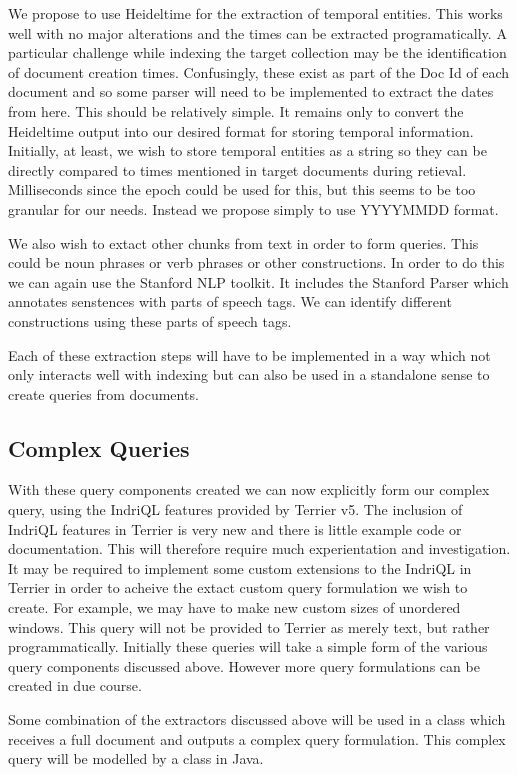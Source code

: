 \documentclass{mprop}
\begin{document}
We propose to use Heideltime for the extraction of temporal entities.
This works well with no major alterations and the times can be extracted programatically.
A particular challenge while indexing the target collection may be the identification of document creation times.
Confusingly, these exist as part of the Doc Id of each document and so some parser will need to be implemented to extract the dates from here.
This should be relatively simple.
It remains only to convert the Heideltime output into our desired format for storing temporal information.
Initially, at least, we wish to store temporal entities as a string so they can be directly compared to times mentioned in target documents during retieval.
Milliseconds since the epoch could be used for this, but this seems to be too granular for our needs.
Instead we propose simply to use YYYYMMDD format.

We also wish to extact other chunks from text in order to form queries.
This could be noun phrases or verb phrases or other constructions.
In order to do this we can again use the Stanford NLP toolkit.
It includes the Stanford Parser which annotates senstences with parts of speech tags.
We can identify different constructions using these parts of speech tags.

Each of these extraction steps will have to be implemented in a way which not only interacts well with indexing but can also be used in a standalone sense to create queries from documents.


\subsection{Complex Queries}
With these query components created we can now explicitly form our complex query, using the IndriQL features provided by Terrier v5. 
The inclusion of IndriQL features in Terrier is very new and there is little example code or documentation.
This will therefore require much experientation and investigation.
It may be required to implement some custom extensions to the IndriQL in Terrier in order to acheive the extact custom query formulation we wish to create.
For example, we may have to make new custom sizes of unordered windows. 
This query will not be provided to Terrier as merely text, but rather programmatically. 
Initially these queries will take a simple form of the various query components discussed above. 
However more query formulations can be created in due course.

Some combination of the extractors discussed above will be used in a class which receives a full document and outputs a complex query formulation.
This complex query will be modelled by a class in Java.
\end{document}
